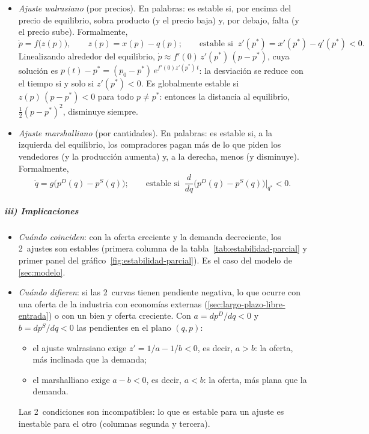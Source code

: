 \documentclass[11pt]{article}
\begin{document}
\begin{itemize}
\item \emph{Ajuste walrasiano} (por precios). En palabras: es estable si, por encima del precio de equilibrio, sobra producto (y el precio baja) y, por debajo, falta (y el precio sube). Formalmente,
  \begin{equation}
  \dot p=f\big(z(p)\big),\qquad z(p)=x(p)-q(p);\qquad \text{estable si }\ z'(p^*)=x'(p^*)-q'(p^*)<0. \label{eq:ajuste-walras}
  \end{equation}
  Linealizando alrededor del equilibrio, $\dot p\approx f'(0)\,z'(p^*)\,(p-p^*)$, cuya solución es $p(t)-p^*=(p_0-p^*)\,e^{f'(0)z'(p^*)\,t}$: la desviación se reduce con el tiempo si y solo si $z'(p^*)<0$. Es globalmente estable si $z(p)\,(p-p^*)<0$ para todo $p\neq p^*$: entonces la distancia al equilibrio, $\tfrac12(p-p^*)^2$, disminuye siempre.
\item \emph{Ajuste marshalliano} (por cantidades). En palabras: es estable si, a la izquierda del equilibrio, los compradores pagan más de lo que piden los vendedores (y la producción aumenta) y, a la derecha, menos (y disminuye). Formalmente,
  \begin{equation}
  \dot q=g\big(p^D(q)-p^S(q)\big);\qquad \text{estable si }\ \frac{d}{dq}\big(p^D(q)-p^S(q)\big)\Big|_{q^*}<0. \label{eq:ajuste-marshall}
  \end{equation}
\end{itemize}

\subparagraph{iii) Implicaciones}

\begin{itemize}
\item \emph{Cuándo coinciden}: con la oferta creciente y la demanda decreciente, los 2~ajustes son estables (primera columna de la tabla~\ref{tab:estabilidad-parcial} y primer panel del gráfico~\ref{fig:estabilidad-parcial}). Es el caso del modelo de \ref{sec:modelo}.
\item \emph{Cuándo difieren}: si las 2~curvas tienen pendiente negativa, lo que ocurre con una oferta de la industria con economías externas (\ref{sec:largo-plazo-libre-entrada}) o con un bien  y oferta creciente. Con $a=dp^D/dq<0$ y $b=dp^S/dq<0$ las pendientes en el plano $(q,p)$:
  \begin{itemize}
  \item el ajuste walrasiano exige $z'=1/a-1/b<0$, es decir, $a>b$: la oferta, más inclinada que la demanda;
  \item el marshalliano exige $a-b<0$, es decir, $a<b$: la oferta, más plana que la demanda.
  \end{itemize}
  Las 2~condiciones son incompatibles: lo que es estable para un ajuste es inestable para el otro (columnas segunda y tercera).
\end{itemize}
\end{document}
